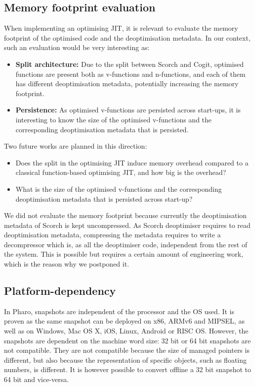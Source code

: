 \documentclass[a4paper,12pt,twoside]{../includes/ThesisStyle}
\begin{document}
\subsection{Memory footprint evaluation}
\label{ss:FWMemFootprint}

When implementing an optimising JIT, it is relevant to evaluate the memory footprint of the optimised code and the deoptimisation metadata. In our context, such an evaluation would be very interesting as:
\begin{itemize}
	\item \textbf{Split architecture:} Due to the split between Scorch and Cogit, optimised functions are present both as v-functions and n-functions, and each of them has different deoptimisation metadata, potentially increasing the memory footprint. 
	\item \textbf{Persistence:} As optimised v-functions are persisted across start-ups, it is interesting to know the size of the optimised v-functions and the corresponding deoptimisation metadata that is persisted.
\end{itemize}

Two future works are planned in this direction:
\begin{itemize}
	\item Does the split in the optimising JIT induce memory overhead compared to a classical function-based optimising JIT, and how big is the overhead?
	\item What is the size of the optimised v-functions and the corresponding deoptimisation metadata that is persisted across start-up?
\end{itemize}

We did not evaluate the memory footprint because currently the deoptimisation metadata of Scorch is kept uncompressed. As Scorch deoptimiser requires to read deoptimisation metadata, compressing the metadata requires to write a decompressor which is, as all the deoptimiser code, independent from the rest of the system. This is possible but requires a certain amount of engineering work, which is the reason why we postponed it.

\subsection{Platform-dependency}
\label{ss:FWPlatDep}

In Pharo, snapshots are independent of the processor and the OS used. It is proven as the same snapshot can be deployed on x86, ARMv6 and MIPSEL, as well as on Windows, Mac OS X, iOS, Linux, Android or RISC OS. However, the snapshots are dependent on the machine word size: 32 bit or 64 bit snapshots are not compatible. They are not compatible because the size of managed pointers is different, but also because the representation of specific objects, such as floating numbers, is different. It is however possible to convert offline a 32 bit snapshot to 64 bit and vice-versa. 
\end{document}
